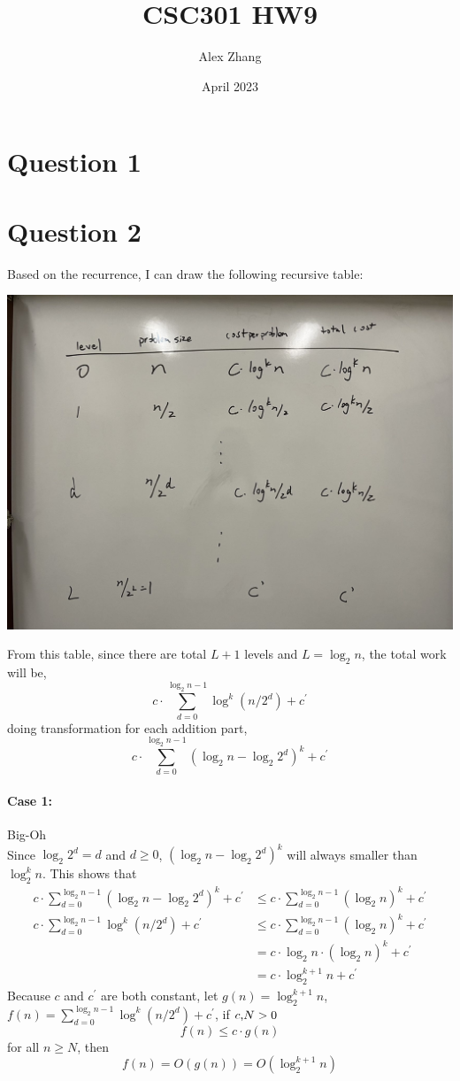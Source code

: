 \documentclass{article}
\title{CSC301 HW9}
\author{Alex Zhang}
\date{April 2023}
\begin{document}
\maketitle

\section*{Question 1}

\section*{Question 2}
Based on the recurrence, I can draw the following recursive table:
\begin{center}
    \includegraphics[scale = 0.15]{cool.jpg}
\end{center}
From this table, since there are total $L+1$ levels and $L = \log_2 n$, 
the total work will be, 
$$c \cdot \sum^{\log_2 n -1}_{d=0}\log^k (n/2^d) + c^\prime $$
doing transformation for each addition part,
$$c \cdot \sum^{\log_2 n -1}_{d=0}(\log_2 n - \log_2 2^d)^k + c^\prime $$
\paragraph{Case 1:} Big-Oh \\
Since $\log_2 2^d = d$ and $d \geq 0$, $(\log_2 n - \log_2 2^d)^k$ will always smaller than $\log^k_2 n$.
This shows that 
\begin{align}
    c \cdot \sum^{\log_2 n -1}_{d=0}(\log_2 n - \log_2 2^d)^k + c^\prime &\leq c \cdot \sum^{\log_2 n -1}_{d=0}(\log_2 n)^k + c^\prime \\ \nonumber
    c \cdot \sum^{\log_2 n -1}_{d=0}\log^k (n/2^d) + c^\prime &\leq c \cdot \sum^{\log_2 n -1}_{d=0}(\log_2 n)^k + c^\prime \\ \nonumber
    &= c \cdot \log_2 n \cdot (\log_2 n)^k + c^\prime \\ \nonumber
    &= c \cdot \log^{k+1}_2 n + c^\prime \nonumber
\end{align}
Because $c$ and $c^\prime$ are both constant, let $g(n) =\log^{k+1}_2 n $, $f(n) =\sum^{\log_2 n -1}_{d=0}\log^k (n/2^d) + c^\prime$, if $c \textmd{,} N> 0$
$$f(n) \leq c \cdot g(n)$$
for all $n \geq N$, then 
$$f(n) = O(g(n)) = O(\log^{k+1}_2 n)$$
\end{document}
